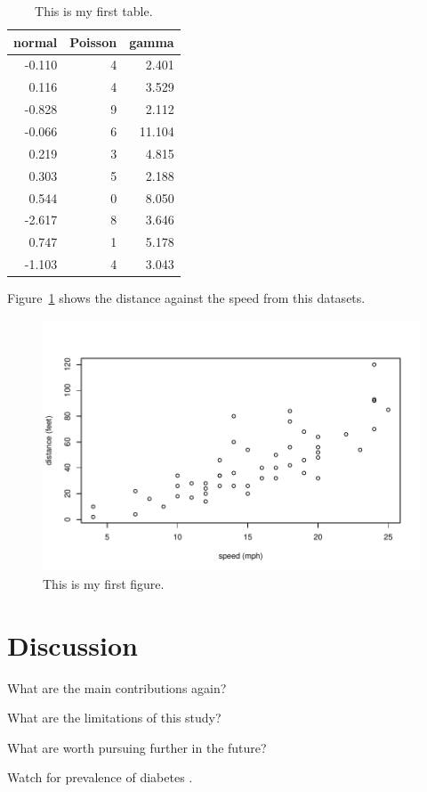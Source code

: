 \documentclass[12pt]{article}
\begin{document}
\begin{table}[tbp]
  \caption{This is my first table.}
  \label{tab:rv}
\centering
\begin{tabular}{rrr}
  \toprule
normal & Poisson & gamma \\ 
  \midrule
-0.110 & 4 & 2.401 \\ 
  0.116 & 4 & 3.529 \\ 
  -0.828 & 9 & 2.112 \\ 
  -0.066 & 6 & 11.104 \\ 
  0.219 & 3 & 4.815 \\ 
  0.303 & 5 & 2.188 \\ 
  0.544 & 0 & 8.050 \\ 
  -2.617 & 8 & 3.646 \\ 
  0.747 & 1 & 5.178 \\ 
  -1.103 & 4 & 3.043 \\ 
   \bottomrule
\end{tabular}
\end{table}

Figure~\ref{fig:cars} shows the distance against the speed from this datasets.


\begin{figure}[tbp]
  \centering
  \includegraphics[width=\textwidth]{cars.pdf}
  \caption{This is my first figure.}
  \label{fig:cars}
\end{figure}

\section{Discussion}
\label{sec:disc}

What are the main contributions again?

What are the limitations of this study?

What are worth pursuing further in the future?

\lipsum[1-2]
Watch for prevalence of diabetes \citep{wild2004global}.



\end{document}
